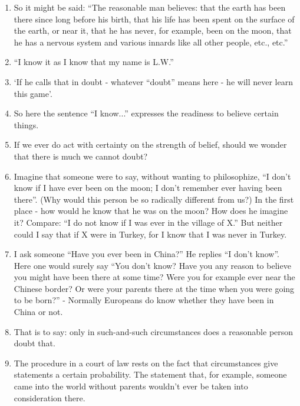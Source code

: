 \documentclass{book}
\begin{document}
\begin{enumerate}
\item
So it might be said: ``The reasonable man believes: that the earth has been
there since long before his birth, that his life has been spent on the surface
of the earth, or near it, that he has never, for example, been on the moon,
that he has a nervous system and various innards like all other people, etc.,
etc.''

\item
``I know it as I know that my name is L.W.''

\item
`If he calls that in doubt - whatever ``doubt'' means here - he will never
learn this game'.

\item
So here the sentence ``I know...'' expresses the readiness to believe certain
things.

\item
If we ever do act with certainty on the strength of belief, should we wonder
that there is much we cannot doubt?

\item
Imagine that someone were to say, without wanting to philosophize, ``I don't
know if I have ever been on the moon; I don't remember ever having been
there''. (Why would this person be so radically different from us?) In the
first place - how would he know that he was on the moon? How does he imagine
it? Compare: ``I do not know if I was ever in the village of X.'' But neither
could I say that if X were in Turkey, for I know that I was never in Turkey.

\item
I ask someone ``Have you ever been in China?'' He replies ``I don't know''.
Here one would surely say ``You don't know? Have you any reason to believe you
might have been there at some time? Were you for example ever near the Chinese
border? Or were your parents there at the time when you were going to be
born?'' - Normally Europeans do know whether they have been in China or not.

\item
That is to say: only in such-and-such circumstances does a reasonable person
doubt that.

\item
The procedure in a court of law rests on the fact that circumstances give
statements a certain probability. The statement that, for example, someone came
into the world without parents wouldn't ever be taken into consideration there.


\end{enumerate}
\end{document}
